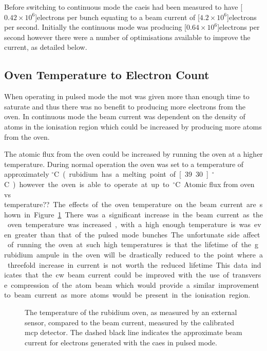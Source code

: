 Before switching to continuous mode the \gls{caeis} had been measured to have \unit[$0.42\times10^6$]{electrons per bunch} equating to a beam current of \unit[$4.2\times10^6$]{electrons per second}.
Initially the continuous mode was producing \unit[$0.64\times10^6$]{electrons per second} however there were a number of optimisations available to improve the current, as detailed below.

\subsection{Oven Temperature to Electron Count}
When operating in pulsed mode the \gls{mot} was given more than enough time to saturate and thus there was no benefit to producing more electrons from the oven.
In continuous mode the beam current was dependent on the density of atoms in the ionisation region which could be increased by producing more atoms from the oven.

The atomic flux from the oven could be increased by running the oven at a higher temperature.
During normal operation the oven was set to a temperature of approximately \unit[80]{$^\circ$C} (rubidium has a melting point of \unit[39.30]{$^\circ$C}) however the oven is able to operate at up to \unit[200]{$^\circ$C}.

{\color{red}Atomic flux from oven vs temperature??}

The effects of the oven temperature on the beam current are shown in Figure~\ref{figure:oven_counts}.
There was a significant increase in the beam current as the oven temperature was increased, with a high enough temperature is was even greater than that of the pulsed mode bunches.
The unfortunate side affect of running the oven at such high temperatures is that the lifetime of the \unit[5]{g} rubidium ampule in the oven will be drastically reduced to the point where a threefold increase in current is not worth the reduced lifetime.
This data indicates that the \gls{cw} beam current could be improved with the use of transverse compression of the atom beam which would provide a similar improvement to beam current as more atoms would be present in the ionisation region.

\begin{figure}
    \center
    
    \caption{The temperature of the rubidium oven, as measured by an external sensor, compared to the beam current, measured by the calibrated \gls{mcp} detector.
    The dashed black line indicates the approximate beam current for electrons generated with the \gls{caes} in pulsed mode.}
    \label{figure:oven_counts}
\end{figure}

